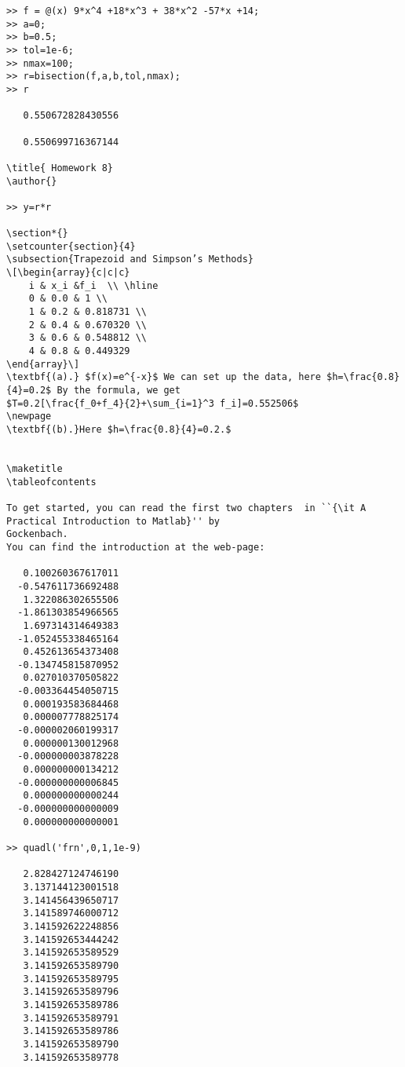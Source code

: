 \begin{verbatim}
>> f = @(x) 9*x^4 +18*x^3 + 38*x^2 -57*x +14;
>> a=0;
>> b=0.5;
>> tol=1e-6;
>> nmax=100;
>> r=bisection(f,a,b,tol,nmax);
>> r

   0.550672828430556

   0.550699716367144

\title{ Homework 8}
\author{}

>> y=r*r

\section*{}
\setcounter{section}{4}
\subsection{Trapezoid and Simpson’s Methods}
\[\begin{array}{c|c|c}
    i & x_i &f_i  \\ \hline
    0 & 0.0 & 1 \\
    1 & 0.2 & 0.818731 \\
    2 & 0.4 & 0.670320 \\
    3 & 0.6 & 0.548812 \\
    4 & 0.8 & 0.449329 
\end{array}\]
\textbf{(a).} $f(x)=e^{-x}$ We can set up the data, here $h=\frac{0.8}{4}=0.2$ By the formula, we get
$T=0.2[\frac{f_0+f_4}{2}+\sum_{i=1}^3 f_i]=0.552506$
\newpage
\textbf{(b).}Here $h=\frac{0.8}{4}=0.2.$


\maketitle
\tableofcontents

To get started, you can read the first two chapters  in ``{\it A Practical Introduction to Matlab}'' by
Gockenbach. 
You can find the introduction at the web-page: 

   0.100260367617011
  -0.547611736692488
   1.322086302655506
  -1.861303854966565
   1.697314314649383
  -1.052455338465164
   0.452613654373408
  -0.134745815870952
   0.027010370505822
  -0.003364454050715
   0.000193583684468
   0.000007778825174
  -0.000002060199317
   0.000000130012968
  -0.000000003878228
   0.000000000134212
  -0.000000000006845
   0.000000000000244
  -0.000000000000009
   0.000000000000001

>> quadl('frn',0,1,1e-9)

   2.828427124746190
   3.137144123001518
   3.141456439650717
   3.141589746000712
   3.141592622248856
   3.141592653444242
   3.141592653589529
   3.141592653589790
   3.141592653589795
   3.141592653589796
   3.141592653589786
   3.141592653589791
   3.141592653589786
   3.141592653589790
   3.141592653589778
\end{verbatim}
\newpage
